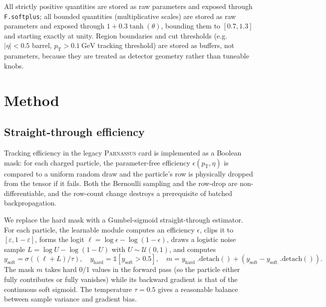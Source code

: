 \documentclass[a4paper,11pt]{article}
\begin{document}
All strictly positive quantities are stored as raw parameters
and exposed through \texttt{F.softplus}; all bounded quantities
(multiplicative scales) are stored as raw parameters and exposed
through $1 + 0.3\tanh(\theta)$, bounding them to $[0.7,1.3]$ and
starting exactly at unity. Region boundaries and cut thresholds
(e.g.\ $|\eta|<0.5$ barrel, $p_\mathrm{T}>\SI{0.1}{\GeV}$ tracking
threshold) are stored as buffers, not parameters, because they are
treated as detector geometry rather than tuneable knobs.

\section{Method}
\label{sec:method}

\subsection{Straight-through efficiency}

Tracking efficiency in the legacy \textsc{Parnassus} card is
implemented as a Boolean mask: for each charged particle, the
parameter-free efficiency $\epsilon(p_\mathrm{T},\eta)$ is compared to
a uniform random draw and the particle's row is physically dropped
from the tensor if it fails. Both the Bernoulli sampling and the
row-drop are non-differentiable, and the row-count change
destroys a prerequisite of batched backpropagation.

We replace the hard mask with a Gumbel-sigmoid straight-through
estimator. For each particle, the learnable module computes an
efficiency $\epsilon$, clips it to $[\varepsilon, 1-\varepsilon]$,
forms the logit $\ell = \log\epsilon - \log(1-\epsilon)$, draws a
logistic noise sample $L = \log U - \log(1-U)$ with $U\sim
\mathcal{U}(0,1)$, and computes
\begin{equation}
 y_{\mathrm{soft}}
 = \sigma\!\left((\ell + L) / \tau\right) ,
 \quad
 y_{\mathrm{hard}} = \mathbb{1}[y_{\mathrm{soft}}>0.5] ,
 \quad
 m = y_{\mathrm{hard}}\!\;.\!\mathrm{detach}()
  + (y_{\mathrm{soft}} - y_{\mathrm{soft}}\!\;.\!\mathrm{detach}()) .
\end{equation}
The mask $m$ takes hard 0/1 values in the forward pass (so the
particle either fully contributes or fully vanishes) while its
backward gradient is that of the continuous soft sigmoid. The
temperature $\tau=0.5$ gives a reasonable balance between sample
variance and gradient bias.
\end{document}
